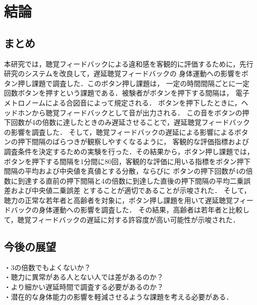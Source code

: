 \chapter{結論}
\section{まとめ}
本研究では，聴覚フィードバックによる違和感を客観的に評価するために，先行研究のシステムを改良して，遅延聴覚フィードバックの
身体運動への影響をボタン押し課題で調査した．このボタン押し課題は，
一定の時間間隔ごとに一定回数ボタンを押すという課題である．被験者がボタンを押下する間隔は，
電子メトロノームによる合図音によって規定される．
ボタンを押下したときに，ヘッドホンから聴覚フィードバックとして音が出力される．
この音をボタンの押下回数が4の倍数に達したときのみ遅延させることで，遅延聴覚フィードバックの影響を調査した．
そして，聴覚フィードバックの遅延による影響によるボタンの押下間隔のばらつきが観察しやすくなるように，
客観的な評価指標および調査条件を決定するための実験を行った．その結果から，ボタン押し課題では，
ボタンを押下する間隔を1分間に80回，客観的な評価に用いる指標をボタン押下間隔の平均および中央値を真値とする分散，ならびに
ボタンの押下回数が4の倍数に到達する直前の押下間隔と4の倍数に到達した直後の押下間隔の平均二乗誤差および中央値二乗誤差
とすることが適切であることが示唆された．
そして，聴力の正常な若年者と高齢者を対象に，ボタン押し課題を用いて遅延聴覚フィードバックの身体運動への影響を調査した．
その結果，高齢者は若年者と比較して，聴覚フィードバックの遅延に対する許容度が高い可能性が示唆された．

\section{今後の展望}
・3の倍数でもよくないか？\\
・聴力に異常がある人とない人では差があるのか？\\
・より細かい遅延時間で調査する必要があるのか？\\
・潜在的な身体能力の影響を軽減させるような課題を考える必要がある．